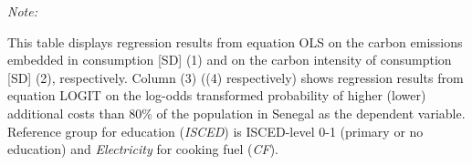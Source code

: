 \begin{table}[htbp!]
\begin{adjustbox}{width = 1\textwidth, max height = 0.95\textheight, center}
\begin{threeparttable}[b]
         \begin{tablenotes}\item \medskip \textit{Note:}
            \item This table displays regression results from equation OLS on the carbon emissions embedded in consumption [SD] (1) and on the carbon intensity of consumption [SD] (2), respectively. 
                                      Column (3) ((4) respectively) shows regression results from equation LOGIT on the log-odds transformed probability of higher (lower) additional costs than 80\% of the population in Senegal as the dependent variable. Reference group for education (\textit{ISCED}) is ISCED-level 0-1 (primary or no education) and \textit{Electricity} for cooking fuel (\textit{CF}).
         \end{tablenotes}
      \end{threeparttable}
   \end{adjustbox}
\end{table}



